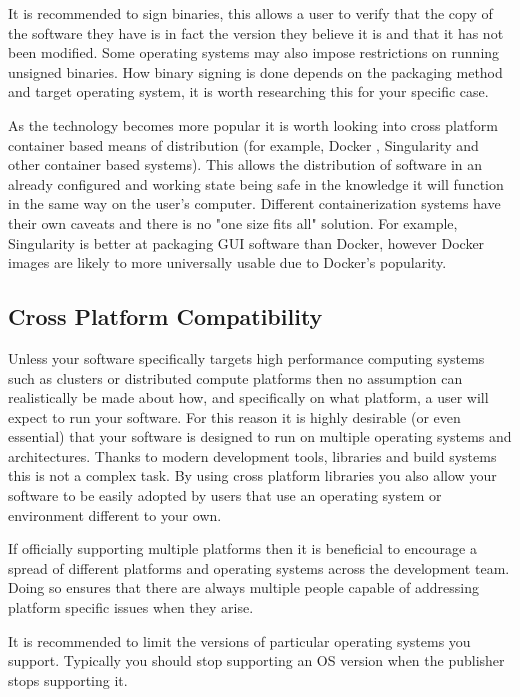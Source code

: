 \documentclass[jnr]{iosart2x}
\begin{document}
It is recommended to sign binaries, this allows a user to verify that the copy of the software they have is in fact the version they believe it is and that it has not been modified.
Some operating systems may also impose restrictions on running unsigned binaries.
How binary signing is done depends on the packaging method and target operating system, it is worth researching this for your specific case.

As the technology becomes more popular it is worth looking into cross platform container based means of distribution (for example, Docker \cite{Docker}, Singularity \cite{Kurtzer_2017} and other container based systems).
This allows the distribution of software in an already configured and working state being safe in the knowledge it will function in the same way on the user's computer.
Different containerization systems have their own caveats and there is no "one size fits all" solution.
For example, Singularity is better at packaging GUI software than Docker, however Docker images are likely to more universally usable due to Docker's popularity.

\subsection{Cross Platform Compatibility}
\label{Cross platform}

Unless your software specifically targets high performance computing systems such as clusters or distributed compute platforms then no assumption can realistically be made about how, and specifically on what platform, a user will expect to run your software.
For this reason it is highly desirable (or even essential) that your software is designed to run on multiple operating systems and architectures.
Thanks to modern development tools, libraries and build systems this is not a complex task.
By using cross platform libraries you also allow your software to be easily adopted by users that use an operating system or environment different to your own.

If officially supporting multiple platforms then it is beneficial to encourage a spread of different platforms and operating systems across the development team.
Doing so ensures that there are always multiple people capable of addressing platform specific issues when they arise.

It is recommended to limit the versions of particular operating systems you support.
Typically you should stop supporting an OS version when the publisher stops supporting it.
\end{document}
